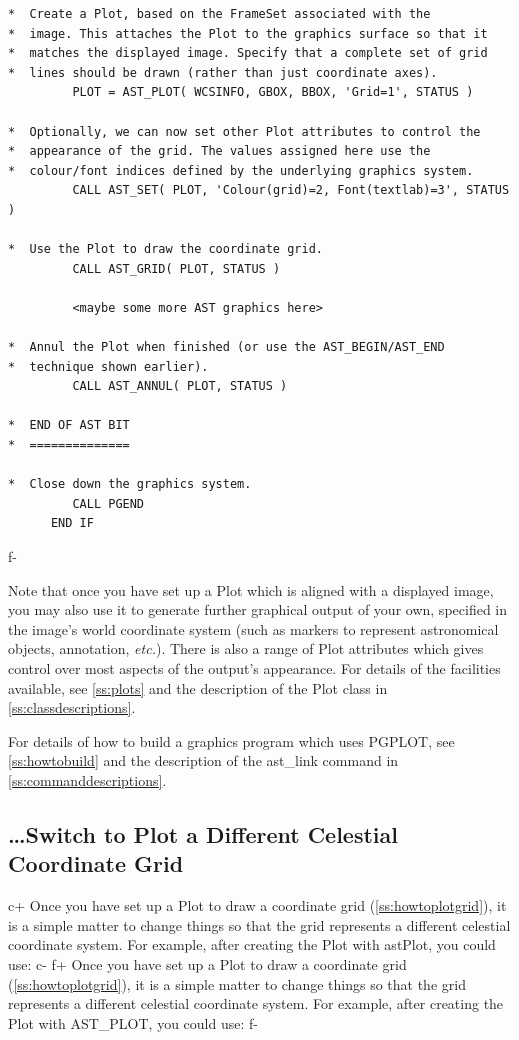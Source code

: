 \documentclass[twoside,11pt]{article}
\newcommand{\appref}[1]{Appendix~\ref{#1}}
\newcommand{\secref}[1]{\S\ref{#1}}
\renewcommand{\appref}[1]{\ref{#1}}
\renewcommand{\secref}[1]{\ref{#1}}
\begin{document}
\begin{verbatim}
*  Create a Plot, based on the FrameSet associated with the
*  image. This attaches the Plot to the graphics surface so that it
*  matches the displayed image. Specify that a complete set of grid
*  lines should be drawn (rather than just coordinate axes).
         PLOT = AST_PLOT( WCSINFO, GBOX, BBOX, 'Grid=1', STATUS )

*  Optionally, we can now set other Plot attributes to control the
*  appearance of the grid. The values assigned here use the
*  colour/font indices defined by the underlying graphics system.
         CALL AST_SET( PLOT, 'Colour(grid)=2, Font(textlab)=3', STATUS )

*  Use the Plot to draw the coordinate grid.
         CALL AST_GRID( PLOT, STATUS )

         <maybe some more AST graphics here>

*  Annul the Plot when finished (or use the AST_BEGIN/AST_END
*  technique shown earlier).
         CALL AST_ANNUL( PLOT, STATUS )

*  END OF AST BIT
*  ==============

*  Close down the graphics system.
         CALL PGEND
      END IF
\end{verbatim}
\normalsize
f-

Note that once you have set up a Plot which is aligned with a
displayed image, you may also use it to generate further graphical
output of your own, specified in the image's world coordinate system
(such as markers to represent astronomical objects, annotation,
{\em{etc.}}). There is also a range of Plot attributes which gives
control over most aspects of the output's appearance.  For details of
the facilities available, see \secref{ss:plots} and the description of
the Plot class in \appref{ss:classdescriptions}.

For details of how to build a graphics program which uses PGPLOT, see
\secref{ss:howtobuild} and the description of the ast\_link command in
\appref{ss:commanddescriptions}.

\subsection{\label{ss:howtoswitchgrid}\ldots Switch to Plot a Different Celestial Coordinate Grid}

c+
Once you have set up a Plot to draw a coordinate grid
(\secref{ss:howtoplotgrid}), it is a simple matter to change things so
that the grid represents a different celestial coordinate system. For
example, after creating the Plot with astPlot, you could use:
c-
f+
Once you have set up a Plot to draw a coordinate grid
(\secref{ss:howtoplotgrid}), it is a simple matter to change things so
that the grid represents a different celestial coordinate system. For
example, after creating the Plot with AST\_PLOT, you could use:
f-
\end{document}
